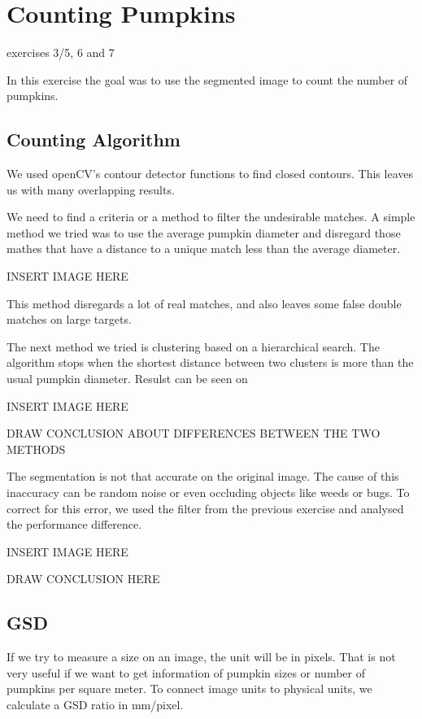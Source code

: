 \documentclass[../Head/Main.tex]{subfiles}
\begin{document}
\section{Counting Pumpkins}
exercises 3/5, 6 and 7

In this exercise the goal was to use the segmented image to count the number of pumpkins.

\subsection{Counting Algorithm}

We used openCV's contour detector functions to find closed contours.
This leaves us with many overlapping results.

We need to find a criteria or a method to filter the undesirable matches. A simple method we tried was to use the average pumpkin diameter and disregard those mathes that have a distance to a unique match less than the average diameter.

INSERT IMAGE HERE

This method disregards a lot of real matches, and also leaves some false double matches on large targets.

The next method we tried is clustering based on a hierarchical search. The algorithm stops when the shortest distance between two clusters is more than the usual pumpkin diameter. Resulst can be seen on

INSERT IMAGE HERE

DRAW CONCLUSION ABOUT DIFFERENCES BETWEEN THE TWO METHODS

The segmentation is not that accurate on the original image. The cause of this inaccuracy can be random noise or even occluding objects like weeds or bugs. To correct for this error, we used the filter from the previous exercise and analysed the performance difference.

INSERT IMAGE HERE

DRAW CONCLUSION HERE

\subsection{GSD}

If we try to measure a size on an image, the unit will be in pixels. That is not very useful if we want to get information of pumpkin sizes or number of pumpkins per square meter. To connect image units to physical units, we calculate a GSD ratio in mm/pixel.
\end{document}
